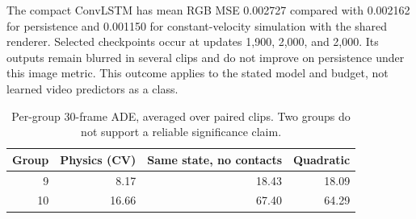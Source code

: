 The compact ConvLSTM has mean RGB MSE 0.002727 compared with 0.002162 for persistence and 0.001150 for constant-velocity simulation with the shared renderer. Selected checkpoints occur at updates 1,900, 2,000, and 2,000. Its outputs remain blurred in several clips and do not improve on persistence under this image metric. This outcome applies to the stated model and budget, not learned video predictors as a class.

\begin{table}[htbp]
\caption{Per-group 30-frame ADE, averaged over paired clips. Two groups do not support a reliable significance claim.}
\label{tab:pergroup}
\centering
\begin{tabular}{rrrr}
\toprule
Group & Physics (CV) & Same state, no contacts & Quadratic \\
\midrule
9 & 8.17 & 18.43 & 18.09 \\
10 & 16.66 & 67.40 & 64.29 \\
\bottomrule
\end{tabular}
\end{table}

